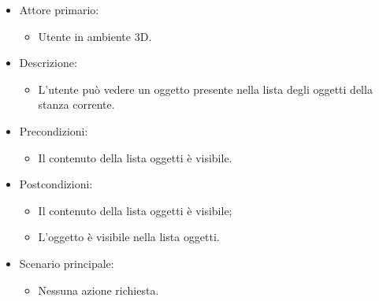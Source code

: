 \begin{itemize}

	\item Attore primario: 
	\begin{itemize}
		\item Utente in ambiente 3D.
	\end{itemize}
	\item Descrizione:
	\begin{itemize}
		\item L'utente può vedere un oggetto presente nella lista degli oggetti della stanza corrente.
	\end{itemize}
	
	\item Precondizioni:
	\begin{itemize}
		\item Il contenuto della lista oggetti è visibile.
	\end{itemize}
	
	\item Postcondizioni:
	\begin{itemize}
		\item Il contenuto della lista oggetti è visibile;
		\item L'oggetto è visibile nella lista oggetti.
	\end{itemize}
	
	\item Scenario principale:
	\begin{itemize}
		\item Nessuna azione richiesta.
	\end{itemize}
	
\end{itemize}


